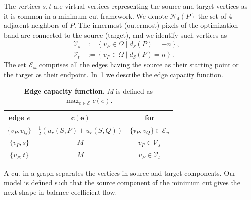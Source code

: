 \documentclass[review]{siamart220329}
\begin{document}
The vertices $s,t$ are virtual vertices representing the source and target vertices as it is common in a minimum cut framework. We denote $\mathcal{N}_4(P)$ the set of $4$-adjacent neighbors of $P$. The innermost (outermost) pixels of the optimization band are connected to the source (target), and we identify such vertices as
%
%
\begin{align*}
	\mathcal{V}_s &:=\left\{ v_P \in \Omega \; | \; d_{S}(P) = -n \right\}, \\
	\mathcal{V}_t &:=\left\{ v_P \in \Omega \; | \; d_{S}(P) = n \right\}.
\end{align*}
%
%
The set $\mathcal{E}_{st}$ comprises all the edges having the source as their starting point or the target as their endpoint. In~\cref{tab:edge-capacity} we describe the edge capacity function.
%
%
\begin{table}
\footnotesize
	\caption{\textbf{Edge capacity function.} $M$ is defined as $\max_{e \in \mathcal{E} }{ c(e) }$.}\label{tab:edge-capacity}
\begin{center}
\begin{tabular}{|c|c|c|}
\hline
\textbf{edge} $e$ & $\mathbf{c(e)}$ & \textbf{for}\\
\hline
$\{v_P, v_Q\}$ & $ \frac{1}{2}\left( u_r(S,P) + u_r(S,Q) \right) $ & $\{v_P,v_Q\} \in \mathcal{E}_{u}$\\
\hline
$\{v_P, s\}$ & $M$ & $v_P \in \mathcal{V}_{s}$ \\
\hline
$\{v_P, t\}$ & $M$ & $v_P \in \mathcal{V}_{t}$ \\
\hline
\end{tabular}
\end{center}
\end{table}
%
%

A cut in a graph separates the vertices in source and target components. Our model is defined such that the source component of the minimum cut gives the next shape in balance-coefficient flow. 

%
%
%
%
\end{document}

